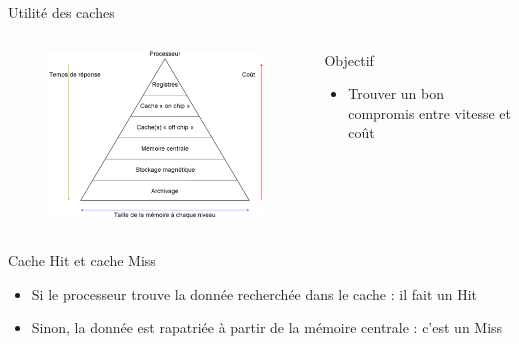 \begin{frame}{Utilité des caches}
	\begin{columns}[T]
		\begin{column}{.5\textwidth}
			\begin{figure}[h!]
				\includegraphics[scale=.45]{images/hierarchy.png}
			\end{figure}
		\end{column}
		\begin{column}{.5\textwidth}
			\begin{block}{Objectif}
				\begin{itemize}
					\item{Trouver un bon compromis entre vitesse et coût}
				\end{itemize}
			\end{block}
		\end{column}
	\end{columns}
	\begin{block}{Cache Hit et cache Miss}
		\begin{itemize}
			\item{Si le processeur trouve la donnée recherchée dans le cache : il fait un Hit}
			\item{Sinon, la donnée est rapatriée à partir de la mémoire centrale : c'est un Miss}
		\end{itemize}
	\end{block}
\end{frame}



